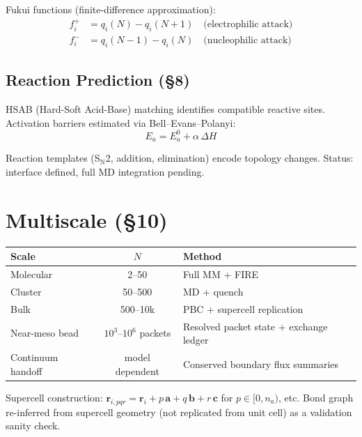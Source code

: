 \documentclass[11pt, a4paper]{article}
\begin{document}
Fukui functions (finite-difference approximation):
\begin{align}
f_i^+ &= q_i(N) - q_i(N+1) \quad \text{(electrophilic attack)} \\
f_i^- &= q_i(N-1) - q_i(N) \quad \text{(nucleophilic attack)}
\end{align}

\subsection{Reaction Prediction (\S8)}

HSAB (Hard-Soft Acid-Base) matching identifies compatible reactive sites.  Activation barriers estimated via Bell--Evans--Polanyi:
\begin{equation}
E_a = E_a^0 + \alpha\,\Delta H
\end{equation}

Reaction templates (S$_\text{N}$2, addition, elimination) encode topology changes.  Status: interface defined, full MD integration pending.


\section{Multiscale (\S10)}

\begin{center}
\begin{tabular}{lcl}
\toprule
Scale & $N$ & Method \\
\midrule
Molecular & 2--50 & Full MM + FIRE \\
Cluster & 50--500 & MD + quench \\
Bulk & 500--10k & PBC + supercell replication \\
Near-meso bead & $10^3$--$10^6$ packets & Resolved packet state + exchange ledger \\
Continuum handoff & model dependent & Conserved boundary flux summaries \\
\bottomrule
\end{tabular}
\end{center}

Supercell construction:
$\mathbf{r}_{i,pqr} = \mathbf{r}_i + p\,\mathbf{a} + q\,\mathbf{b} + r\,\mathbf{c}$
for $p \in [0, n_a)$, etc.  Bond graph re-inferred from supercell geometry (not replicated from unit cell) as a validation sanity check.
\end{document}
